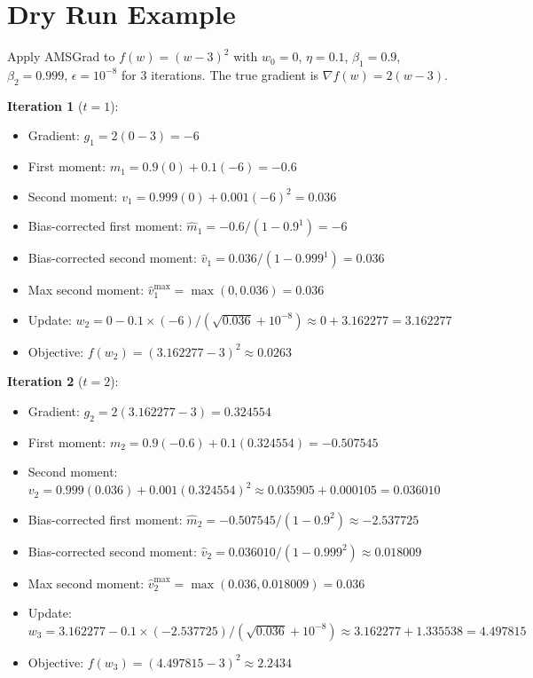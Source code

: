 \documentclass{article}
\begin{document}
\section*{Dry Run Example}
Apply AMSGrad to $f(w) = (w-3)^2$ with $w_0 = 0$, $\eta = 0.1$, $\beta_1 = 0.9$, $\beta_2 = 0.999$, $\epsilon = 10^{-8}$ for 3 iterations. The true gradient is $\nabla f(w) = 2(w-3)$.

\textbf{Iteration 1} ($t=1$):
\begin{itemize}
\item Gradient: $g_1 = 2(0-3) = -6$
\item First moment: $m_1 = 0.9(0) + 0.1(-6) = -0.6$
\item Second moment: $v_1 = 0.999(0) + 0.001(-6)^2 = 0.036$
\item Bias-corrected first moment: $\hat{m}_1 = -0.6 / (1 - 0.9^1) = -6$
\item Bias-corrected second moment: $\hat{v}_1 = 0.036 / (1 - 0.999^1) = 0.036$
\item Max second moment: $\hat{v}_1^{\max} = \max(0, 0.036) = 0.036$
\item Update: $w_2 = 0 - 0.1 \times (-6) / (\sqrt{0.036} + 10^{-8}) \approx 0 + 3.162277 = 3.162277$
\item Objective: $f(w_2) = (3.162277 - 3)^2 \approx 0.0263$
\end{itemize}

\textbf{Iteration 2} ($t=2$):
\begin{itemize}
\item Gradient: $g_2 = 2(3.162277 - 3) = 0.324554$
\item First moment: $m_2 = 0.9(-0.6) + 0.1(0.324554) = -0.507545$
\item Second moment: $v_2 = 0.999(0.036) + 0.001(0.324554)^2 \approx 0.035905 + 0.000105 = 0.036010$
\item Bias-corrected first moment: $\hat{m}_2 = -0.507545 / (1 - 0.9^2) \approx -2.537725$
\item Bias-corrected second moment: $\hat{v}_2 = 0.036010 / (1 - 0.999^2) \approx 0.018009$
\item Max second moment: $\hat{v}_2^{\max} = \max(0.036, 0.018009) = 0.036$
\item Update: $w_3 = 3.162277 - 0.1 \times (-2.537725) / (\sqrt{0.036} + 10^{-8}) \approx 3.162277 + 1.335538 = 4.497815$
\item Objective: $f(w_3) = (4.497815 - 3)^2 \approx 2.2434$
\end{itemize}
\end{document}
